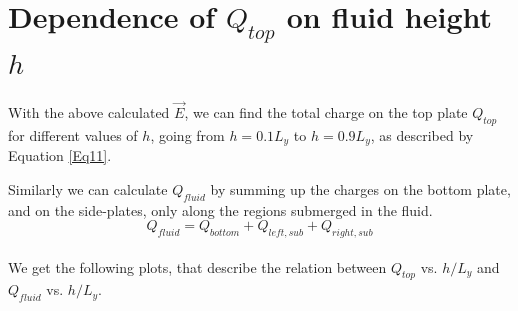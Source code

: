 \documentclass[11pt, a4paper, twoside]{report}
\begin{document}
    \section{Dependence of $Q_{top}$ on fluid height $h$}
        With the above calculated $\vec{E}$, we can find the total charge on the top plate $Q_{top}$ for different values of $h$, going from $h=0.1L_y$ to $h=0.9L_y$, as described by Equation \eqref{Eq11}.

        Similarly we can calculate $Q_{fluid}$ by summing up the charges on the bottom plate, and on the side-plates, only along the regions submerged in the fluid.
            \begin{equation}
                Q_{fluid} = Q_{bottom} + Q_{left, sub} + Q_{right, sub}
            \end{equation}\\

        We get the following plots, that describe the relation between $Q_{top}$ vs. $h/L_y$  and $Q_{fluid}$ vs. $h/L_y$.
\end{document}
